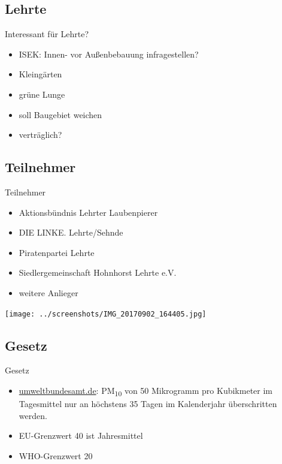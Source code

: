 \documentclass[aspectratio=169]{beamer} %
\begin{document}
\subsection{Lehrte}
\begin{frame}{Interessant für Lehrte?}
  \begin{itemize}
  \item ISEK: Innen- vor Außenbebauung infragestellen?
  \item Kleingärten
  \item grüne Lunge
  \item soll Baugebiet weichen
  \item verträglich?
  \end{itemize}
\end{frame}

\subsection{Teilnehmer}
\begin{frame}{Teilnehmer}
  \begin{itemize}
  \item Aktionsbündnis Lehrter Laubenpierer
  \item DIE LINKE. Lehrte/Sehnde
  \item Piratenpartei Lehrte
  \item Siedlergemeinschaft Hohnhorst Lehrte e.V.
  \item weitere Anlieger
  \end{itemize}
  \begin{center}
    \texttt{[image: ../screenshots/IMG\_20170902\_164405.jpg]}
  \end{center}
\end{frame}

\subsection{Gesetz}
\begin{frame}{Gesetz}
  \begin{itemize}
  \item \href{https://www.umweltbundesamt.de/daten/luft/feinstaub-belastung}{umweltbundesamt.de}:
    PM\textsubscript{10} von 50 Mikrogramm pro Kubikmeter im Tagesmittel nur an höchstens 35 Tagen im Kalenderjahr überschritten werden.
  \item EU-Grenzwert 40 ist Jahresmittel
  \item WHO-Grenzwert 20
  \end{itemize}
\end{frame}
\end{document}
